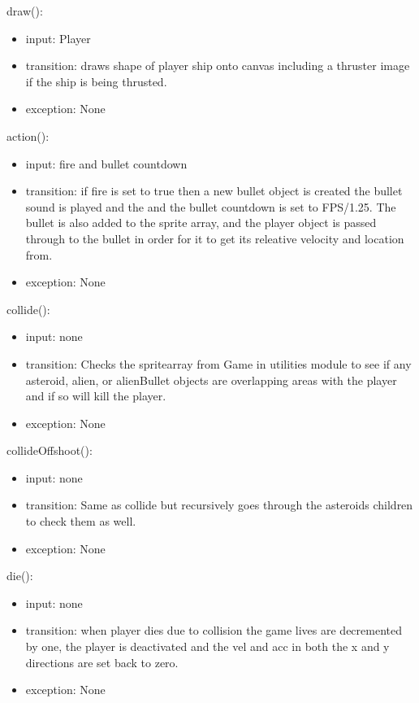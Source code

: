 \documentclass[12pt]{article}
\begin{document}
\noindent draw():
\begin{itemize}
  \item input: Player
  \item transition: draws shape of player ship onto canvas including a thruster image if the ship is being thrusted.
  \item exception: None
\end{itemize}

\noindent action():
\begin{itemize}
  \item input: fire and bullet countdown
  \item transition: if fire is set to true then a new bullet object is created the bullet sound is played and the and the bullet countdown is set to FPS/1.25. The bullet is also added to the sprite array, and the player object is passed through to the bullet in order for it to get its releative velocity and location from.
  \item exception: None
\end{itemize}

\noindent collide():
\begin{itemize}
  \item input: none
  \item transition: Checks the spritearray from Game in utilities module to see if any asteroid, alien, or alienBullet objects are overlapping areas with the player and if so will kill the player.
  \item exception: None
\end{itemize}

\noindent collideOffshoot():
\begin{itemize}
  \item input: none
  \item transition: Same as collide but recursively goes through the asteroids children to check them as well.
  \item exception: None
\end{itemize}

\noindent die():
\begin{itemize}
  \item input: none
  \item transition: when player dies due to collision the game lives are decremented by one, the player is deactivated and the vel and acc in both the x and y directions are set back to zero.
  \item exception: None
\end{itemize}
\end{document}
